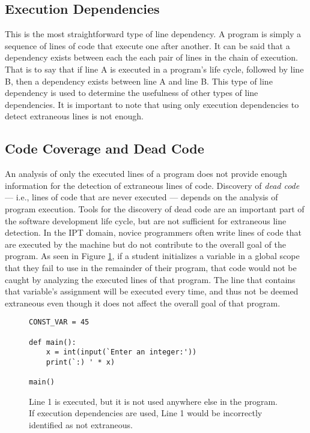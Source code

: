 
\subsection{Execution Dependencies}
This is the most straightforward type of line dependency. A program is simply a sequence of lines of code that execute one after another. It can be said that a dependency exists between each the each pair of lines in the chain of execution. That is to say that if line A is executed in a program's life cycle, followed by line B, then a dependency exists between line A and line B. This type of line dependency is used to determine the usefulness of other types of line dependencies. It is important to note that using only execution dependencies to detect extraneous lines is not enough.


\subsection{Code Coverage and Dead Code}
An analysis of only the executed lines of a program does not provide enough information for the detection of extraneous lines of code. Discovery of \emph{dead code} --- i.e., lines of code that are never executed --- depends on the analysis of program execution. Tools for the discovery of dead code are an important part of the software development life cycle, but are not sufficient for extraneous line detection. In the IPT domain, novice programmers often write lines of code that are executed by the machine but do not contribute to the overall goal of the program. As seen in Figure \ref{fig:deadcodecounterexample}, if a student initializes a variable in a global scope that they fail to use in the remainder of their program, that code would not be caught by analyzing the executed lines of that program. The line that contains that variable's assignment will be executed every time, and thus not be deemed extraneous even though it does not affect the overall goal of that program.
\begin{figure}
\begin{lstlisting}
CONST_VAR = 45

def main():
    x = int(input(`Enter an integer:'))
    print(`:) ' * x)

main()
\end{lstlisting}
\caption{Line 1 is executed, but it is not used anywhere else in the program. If execution dependencies are used, Line 1 would be incorrectly identified as not extraneous.}
\label{fig:deadcodecounterexample}
\end{figure}

